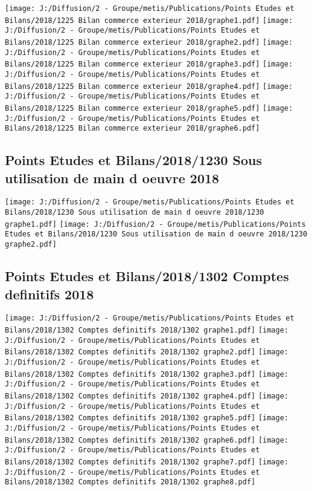 \documentclass[
]{article}
\begin{document}
\texttt{[image: J:/Diffusion/2 - Groupe/metis/Publications/Points Etudes et Bilans/2018/1225 Bilan commerce exterieur 2018/graphe1.pdf]}
\texttt{[image: J:/Diffusion/2 - Groupe/metis/Publications/Points Etudes et Bilans/2018/1225 Bilan commerce exterieur 2018/graphe2.pdf]}
\texttt{[image: J:/Diffusion/2 - Groupe/metis/Publications/Points Etudes et Bilans/2018/1225 Bilan commerce exterieur 2018/graphe3.pdf]}
\texttt{[image: J:/Diffusion/2 - Groupe/metis/Publications/Points Etudes et Bilans/2018/1225 Bilan commerce exterieur 2018/graphe4.pdf]}
\texttt{[image: J:/Diffusion/2 - Groupe/metis/Publications/Points Etudes et Bilans/2018/1225 Bilan commerce exterieur 2018/graphe5.pdf]}
\texttt{[image: J:/Diffusion/2 - Groupe/metis/Publications/Points Etudes et Bilans/2018/1225 Bilan commerce exterieur 2018/graphe6.pdf]}

\hypertarget{points-etudes-et-bilans20181230-sous-utilisation-de-main-d-oeuvre-2018}{%
\subsection{Points Etudes et Bilans/2018/1230 Sous utilisation de main d
oeuvre
2018}\label{points-etudes-et-bilans20181230-sous-utilisation-de-main-d-oeuvre-2018}}

\texttt{[image: J:/Diffusion/2 - Groupe/metis/Publications/Points Etudes et Bilans/2018/1230 Sous utilisation de main d oeuvre 2018/1230 graphe1.pdf]}
\texttt{[image: J:/Diffusion/2 - Groupe/metis/Publications/Points Etudes et Bilans/2018/1230 Sous utilisation de main d oeuvre 2018/1230 graphe2.pdf]}

\hypertarget{points-etudes-et-bilans20181302-comptes-definitifs-2018}{%
\subsection{Points Etudes et Bilans/2018/1302 Comptes definitifs
2018}\label{points-etudes-et-bilans20181302-comptes-definitifs-2018}}

\texttt{[image: J:/Diffusion/2 - Groupe/metis/Publications/Points Etudes et Bilans/2018/1302 Comptes definitifs 2018/1302 graphe1.pdf]}
\texttt{[image: J:/Diffusion/2 - Groupe/metis/Publications/Points Etudes et Bilans/2018/1302 Comptes definitifs 2018/1302 graphe2.pdf]}
\texttt{[image: J:/Diffusion/2 - Groupe/metis/Publications/Points Etudes et Bilans/2018/1302 Comptes definitifs 2018/1302 graphe3.pdf]}
\texttt{[image: J:/Diffusion/2 - Groupe/metis/Publications/Points Etudes et Bilans/2018/1302 Comptes definitifs 2018/1302 graphe4.pdf]}
\texttt{[image: J:/Diffusion/2 - Groupe/metis/Publications/Points Etudes et Bilans/2018/1302 Comptes definitifs 2018/1302 graphe5.pdf]}
\texttt{[image: J:/Diffusion/2 - Groupe/metis/Publications/Points Etudes et Bilans/2018/1302 Comptes definitifs 2018/1302 graphe6.pdf]}
\texttt{[image: J:/Diffusion/2 - Groupe/metis/Publications/Points Etudes et Bilans/2018/1302 Comptes definitifs 2018/1302 graphe7.pdf]}
\texttt{[image: J:/Diffusion/2 - Groupe/metis/Publications/Points Etudes et Bilans/2018/1302 Comptes definitifs 2018/1302 graphe8.pdf]}
\end{document}
